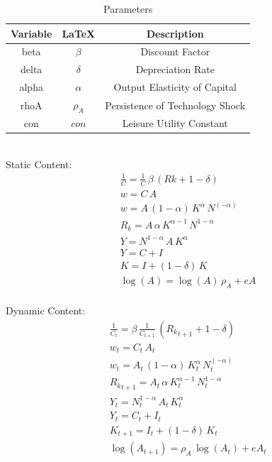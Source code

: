 \documentclass[12pt]{extarticle}
\begin{document}
\vspace{1cm}
\begin{table}[h]
    \caption{Parameters}

    \centering
    \begin{tabular}{ccc}
    \hline
    \textbf{Variable} & \textbf{\LaTeX} & \textbf{Description} \\
    \hline\hline
    beta & $\beta$ & Discount Factor \\
    delta & $\delta$ & Depreciation Rate \\
    alpha & $\alpha$ & Output Elasticity of Capital \\
    rhoA & $\rho_A$ & Persistence of Technology Shock \\
    con & $con$ & Leisure Utility Constant \\
    \hline
    \end{tabular}
\end{table}\\
\newpage
Static Content:\\
\begin{align}
    &\frac{1}{{C}}=\frac{1}{{C}}\, {\beta}\, \left({Rk}+1-{\delta}\right)\\
    &{w}={C}\, {A}\\
    &{w}={A}\, \left(1-{\alpha}\right)\, {K}^{{\alpha}}\, {N}^{\left(-{\alpha}\right)}\\
    &{R_k}={A}\, {\alpha}\, {K}^{{\alpha}-1}\, {N}^{1-{\alpha}}\\
    &{Y}={N}^{1-{\alpha}}\, {A}\, {K}^{{\alpha}}\\
    &{Y}={C}+{I}\\
    &{K}={I}+\left(1-{\delta}\right)\, {K}\\
    &\log\left({A}\right)=\log\left({A}\right)\, {\rho_A}+{eA}
    \end{align}\\
Dynamic Content:
\begin{align}
    &\frac{1}{{C}_{t}}={\beta}\, \frac{1}{{C}_{t+1}}\, \left({R_k}_{t+1}+1-{\delta}\right)\\
    &{w}_{t}={C}_{t}\, {A}_{t}\\
    &{w}_{t}={A}_{t}\, \left(1-{\alpha}\right)\, {K}_{t}^{{\alpha}}\, {N}_{t}^{\left(-{\alpha}\right)}\\
    &{R_k}_{t+1}={A}_{t}\, {\alpha}\, {K}_{t}^{{\alpha}-1}\, {N}_{t}^{1-{\alpha}}\\
    &{Y}_{t}={N}_{t}^{1-{\alpha}}\, {A}_{t}\, {K}_{t}^{{\alpha}}\\
    &{Y}_{t}={C}_{t}+{I}_{t}\\
    &{K}_{t+1}={I}_{t}+\left(1-{\delta}\right)\, {K}_{t}\\
    &\log\left({A}_{t+1}\right)={\rho_A}\, \log\left({A}_{t}\right)+{eA}_{t}
    \end{align}\\
\end{document}
